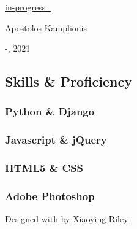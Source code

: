 \documentclass[
  english,
]{article}
\begin{document}
\protect\hyperlink{}{in-progress 🚧}

Apostolos Kamplionis

-, 2021

\hypertarget{skills-proficiency}{%
\subsection{\texorpdfstring{{ \emph{} \emph{} } Skills \&
Proficiency}{    Skills \& Proficiency}}\label{skills-proficiency}}

\hypertarget{python-django}{%
\subsubsection{Python \& Django}\label{python-django}}

\hypertarget{javascript-jquery}{%
\subsubsection{Javascript \& jQuery}\label{javascript-jquery}}

\hypertarget{html5-css}{%
\subsubsection{HTML5 \& CSS}\label{html5-css}}

\hypertarget{adobe-photoshop}{%
\subsubsection{Adobe Photoshop}\label{adobe-photoshop}}

{Designed with \emph{} by \href{http://themes.3rdwavemedia.com}{Xiaoying
Riley}}
\end{document}
